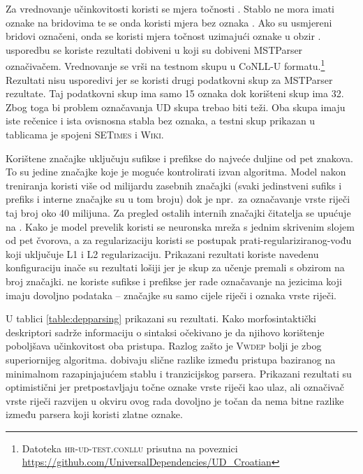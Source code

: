 Za vrednovanje učinkovitosti koristi se mjera točnosti . Stablo
ne mora imati oznake na bridovima te se onda koristi mjera bez oznaka
. Ako su usmjereni bridovi označeni, onda
se koristi mjera točnost uzimajući oznake u obzir . usporedbu se koriste rezultati dobiveni u \citep{agic2013three}
koji su dobiveni MSTParser označivačem. Vrednovanje se vrši na testnom skupu u
CoNLL-U formatu.\footnote{Datoteka \textsc{hr-ud-test.conllu} prisutna na
poveznici \url{https://github.com/UniversalDependencies/UD_Croatian}} Rezultati
nisu usporedivi jer se koristi drugi podatkovni skup za MSTParser rezultate. Taj
podatkovni skup ima samo 15 oznaka dok korišteni skup ima 32. Zbog toga bi
problem označavanja UD skupa trebao biti teži. Oba skupa imaju iste rečenice i
ista ovisnosna stabla bez oznaka, a testni skup prikazan u tablicama je spojeni
\textsc{SETimes} i \textsc{Wiki}.

Korištene značajke uključuju sufikse i prefikse do najveće duljine od pet
znakova. To su jedine značajke koje je moguće kontrolirati izvan algoritma.
Model nakon treniranja koristi više od milijardu zasebnih značajki (svaki
jedinstveni sufiks i prefiks i interne značajke su u tom broju) dok je npr.~za
označavanje vrste riječi taj broj oko 40 milijuna. Za pregled ostalih internih
značajki čitatelja se upućuje na \citep{chang2015learning}. Kako je model
prevelik koristi se neuronska mreža s jednim skrivenim slojem od pet čvorova, a
za regularizaciju koristi se postupak prati-regulariziranog-vođu  koji uključuje L1 i L2 regularizaciju. Prikazani
rezultati koriste navedenu konfiguraciju inače su rezultati lošiji jer je skup
za učenje premali s obzirom na broj značajki. \citet{chang2015learning} ne
koriste sufikse i prefikse jer rade označavanje na jezicima koji imaju dovoljno
podataka -- značajke su samo cijele riječi i oznaka vrste riječi.

U tablici \ref{table:depparsing} prikazani su rezultati. Kako morfosintaktički
deskriptori sadrže informaciju o sintaksi očekivano je da njihovo korištenje
poboljšava učinkovitost oba pristupa. Razlog zašto je \textsc{Vwdep} bolji je
zbog superiornijeg algoritma. \citet{cer2010parsing} dobivaju slične razlike
između pristupa baziranog na minimalnom razapinjajućem stablu i tranzicijskog
parsera. Prikazani rezultati su optimistični jer pretpostavljaju točne oznake
vrste riječi kao ulaz, ali označivač vrste riječi razvijen u okviru ovog rada
dovoljno je točan da nema bitne razlike između parsera koji koristi zlatne
oznake.

